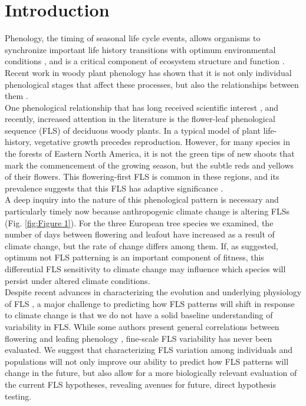 \documentclass[12pt]{article}\usepackage[]{graphicx}\usepackage[]{color}
\begin{document}
\section*{Introduction}
\indent \indent Phenology, the timing of seasonal life cycle events, allows organisms to synchronize important life history transitions with optimum environmental conditions \citep{Forrest2010}, and is a critical component of ecosystem structure and function \citep{Cleland2007,Piao2007}. Recent work in woody plant phenology has shown that it is not only individual phenological stages that affect these processes, but also the relationships between them \citep{Ettinger2018}.\\
\indent One phenological relationship that has long received scientific interest \citep[see][]{Robertson1895}, and recently, increased attention in the literature \citep{Savage2019, Gougherty2018} is the flower-leaf phenological sequence (FLS) of deciduous woody plants. In a typical model of plant life-history, vegetative growth precedes reproduction. However, for many species in the forests of Eastern North America, it is not the green tips of new shoots that mark the commencement of the growing season, but the subtle reds and yellows of their flowers. This flowering-first FLS is common in these regions, and its prevalence suggests that this FLS has adaptive significance \citep{Rathcke_1985}.\\ 

\indent A deep inquiry into the nature of this phenological pattern is necessary and particularly timely now because anthropogenic climate change is altering FLSs (Fig. \ref{fig:Figure 1}). For the three European tree species we examined, the number of days between flowering and leafout have increased as a result of climate change, but the rate of change differs among them. If, as suggested, optimum not FLS patterning is an important component of fitness, this differential FLS sensitivity to climate change may influence which species will persist under altered climate conditions.\\

\indent Despite recent advances in characterizing the evolution and underlying physiology of FLS \citep{Gougherty2018,Savage2019}, a major challenge to predicting how FLS patterns will shift in response to climate change is that we do not have a solid baseline understanding of variability in FLS. While some authors present general correlations between flowering and leafing phenology \citep{Lechowicz_1995, Ettinger2018}, fine-scale FLS variability has never been evaluated. We suggest that characterizing FLS variation among individuals and populations will not only improve our ability to predict how FLS patterns will change in the future, but also allow for a more biologically relevant evaluation of the current FLS hypotheses, revealing avenues for future, direct hypothesis testing.\\
\end{document}
